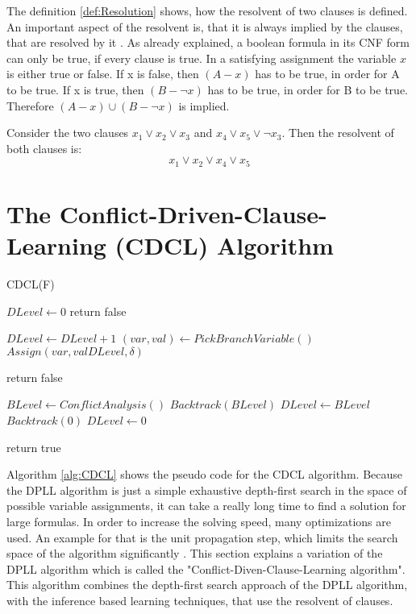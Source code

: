 The definition \ref{def:Resolution} shows, how the resolvent of two clauses is defined. An important aspect of the resolvent is, that it is always implied by the clauses, that are resolved by it \cite{biere2009handbook}. As already explained, a boolean formula in its CNF form can only be true, if every clause is true. In a satisfying assignment the variable $x$ is either true or false. If x is false, then $(A - x)$ has to be true, in order for A to be true. If x is true, then $(B - \neg x)$ has to be true, in order for B to be true. Therefore $(A - x) \cup (B - \neg x)$ is implied.

\begin{leftbar}
Consider the two clauses $x_1 \vee x_2 \vee x_3$ and $x_4 \vee x_5 \vee \neg x_3$. Then the resolvent of both clauses is:
\begin{displaymath}
x_1 \vee x_2 \vee x_4 \vee x_5
\end{displaymath}
\end{leftbar}

\section{The Conflict-Driven-Clause-Learning (CDCL) Algorithm}
\label{sec:cdcl}

\begin{algorithm}
\caption{CDCL(F) \cite{biere2009handbook}}\label{alg:CDCL}
\begin{algorithmic}
\State $DLevel \gets 0$
	\State return false
\EndIf

	\State $DLevel \gets DLevel + 1$
	\State $(var, val) \gets PickBranchVariable()$
	\State $Assign(var, val DLevel, \delta)$
	
			\State return false
		\EndIf
	
	
		\State $BLevel \gets ConflictAnalysis()$
		\State $Backtrack(BLevel)$
		\State $DLevel \gets BLevel$
			\State $Backtrack(0)$
			\State $DLevel \gets 0$
		\EndIf
	\EndWhile
\EndWhile

\State return true

\end{algorithmic}
\end{algorithm}

Algorithm \ref{alg:CDCL} \cite{biere2009handbook} shows the pseudo code for the CDCL algorithm. Because the DPLL algorithm is just a simple exhaustive depth-first search in the space of possible variable assignments, it can take a really long time to find a solution for large formulas. In order to increase the solving speed, many optimizations are used. An example for that is the unit propagation step, which limits the search space of the algorithm significantly \cite{biere2009handbook}. This section explains a variation of the DPLL algorithm which is called the "Conflict-Diven-Clause-Learning algorithm". This algorithm combines the depth-first search approach of the DPLL algorithm, with the inference based learning techniques, that use the resolvent of clauses. \cite{biere2009handbook}

